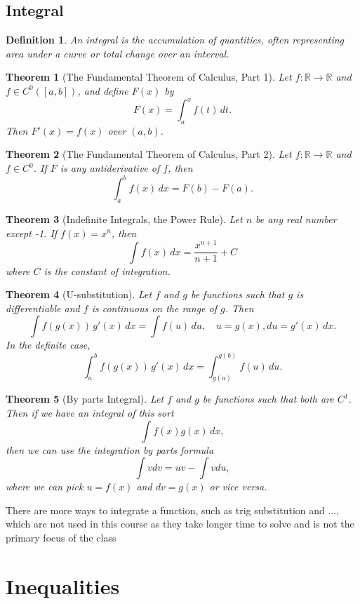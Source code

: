 \documentclass{article}
\newtheorem{theorem}{Theorem}
\newtheorem{definition}{Definition}
\begin{document}
\subsection{Integral}
\begin{definition}
    An integral is the accumulation of quantities, often representing area under a curve or total change over an interval.
\end{definition}
\begin{theorem}[The Fundamental Theorem of Calculus, Part 1]
    Let \(f : \mathbb{R} \to \mathbb{R}\) and \(f \in C^0([a,b])\), and define \(F(x)\) by \[F(x) = \int_{a}^{x} f(t)\, dt.\] Then \(F'(x) = f(x)\) over \((a,b)\).
\end{theorem}
\begin{theorem}[The Fundamental Theorem of Calculus, Part 2]
    Let \(f : \mathbb{R} \to \mathbb{R}\) and \(f \in C^0\). If \(F\) is any antiderivative of \(f\), then
    \[\int_{a}^{b} f(x)\, dx = F(b) - F(a).\]
\end{theorem}
\begin{theorem}[Indefinite Integrals, the Power Rule]
    Let \(n\) be any real number except -1. If \(f(x) = x^n\), then
    \[\int f(x)\, dx = \frac{x^{n + 1}}{n + 1} + C\] where \(C\) is the constant of integration.
\end{theorem}
\begin{theorem}[U-substitution]
    Let \(f\) and \(g\) be functions such that \(g\) is differentiable and \(f\) is continuous on the range of \(g\). Then
    \[\int f(g(x))\,g'(x)\, dx = \int f(u)\, du, \quad u = g(x), du = g'(x)\,dx.\]
    In the definite case,
    \[\int_a^b f(g(x))\,g'(x)\, dx = \int_{g(a)}^{g(b)} f(u)\, du.\]
\end{theorem}
\begin{theorem}[By parts Integral]
    Let $f$ and $g$ be functions such that both are $C^1$. Then if we have an integral of this sort
    \[\int f(x)g(x)\, dx,\]
    then we can use the integration by parts formula
    \[\int v dv = uv - \int v du,\]
    where we can pick $u = f(x)$ and $dv = g(x)$ or vice versa.
\end{theorem}

There are more ways to integrate a function, such as trig substitution and ..., which are not used in this course as they take longer time to solve and is not the primary focus of the class

\section{Inequalities}
\end{document}

